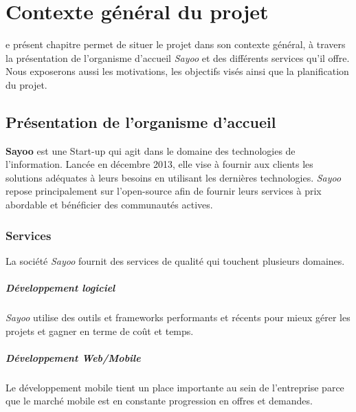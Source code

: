 \chapter{Contexte général du projet}
\begin{onehalfspace}

e présent chapitre permet de situer le projet dans son contexte général, à travers la présentation de l'organisme d'accueil \emph{Sayoo} et des différents services qu'il offre. Nous exposerons aussi les motivations, les objectifs visés ainsi que la planification du projet.

\newpage


\section{Présentation de l'organisme d'accueil}

\textbf{Sayoo} est une Start-up qui agit dans le domaine des technologies de l'information. Lancée en décembre 2013, elle vise à fournir aux clients les solutions adéquates à leurs besoins en utilisant les dernières technologies. \emph{Sayoo} repose principalement sur l’open-source afin de fournir leurs services à prix abordable et bénéficier des communautés actives. 



\subsection{Services}
La société \emph{Sayoo} fournit des services de qualité qui touchent plusieurs domaines.
\paragraph*{Développement logiciel}
\emph{Sayoo} utilise des outils et frameworks performants et récents pour mieux gérer les projets et gagner en terme de coût et temps.

\paragraph*{Développement Web/Mobile}
Le développement mobile tient un place importante au sein de l'entreprise parce que le marché mobile est en constante progression en offres et demandes. 


\end{onehalfspace}
